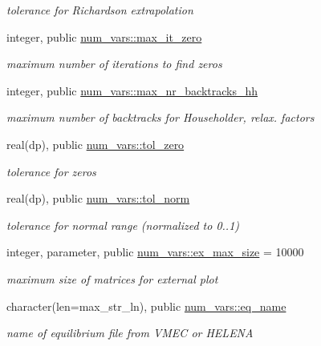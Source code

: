 \begin{DoxyCompactItemize}
\begin{DoxyCompactList}\small\item\em tolerance for Richardson extrapolation \end{DoxyCompactList}\item 
integer, public \hyperlink{namespacenum__vars_ad35971574ecb900c805b8d08745160e6}{num\+\_\+vars\+::max\+\_\+it\+\_\+zero}
\begin{DoxyCompactList}\small\item\em maximum number of iterations to find zeros \end{DoxyCompactList}\item 
integer, public \hyperlink{namespacenum__vars_aa77741498300b095e49a5d8344480b68}{num\+\_\+vars\+::max\+\_\+nr\+\_\+backtracks\+\_\+hh}
\begin{DoxyCompactList}\small\item\em maximum number of backtracks for Householder, relax. factors \end{DoxyCompactList}\item 
real(dp), public \hyperlink{namespacenum__vars_ae2387f8182114da91104322ca3250d9a}{num\+\_\+vars\+::tol\+\_\+zero}
\begin{DoxyCompactList}\small\item\em tolerance for zeros \end{DoxyCompactList}\item 
real(dp), public \hyperlink{namespacenum__vars_a301b25f19135f2bee8ccce99257ae86c}{num\+\_\+vars\+::tol\+\_\+norm}
\begin{DoxyCompactList}\small\item\em tolerance for normal range (normalized to 0..1) \end{DoxyCompactList}\item 
integer, parameter, public \hyperlink{namespacenum__vars_a032fd6a1d45689b56362d8aab1cdc57c}{num\+\_\+vars\+::ex\+\_\+max\+\_\+size} = 10000
\begin{DoxyCompactList}\small\item\em maximum size of matrices for external plot \end{DoxyCompactList}\item 
character(len=max\+\_\+str\+\_\+ln), public \hyperlink{namespacenum__vars_a3cc0fc4b1538f7203be1604cb4f7c9bc}{num\+\_\+vars\+::eq\+\_\+name}
\begin{DoxyCompactList}\small\item\em name of equilibrium file from V\+M\+EC or H\+E\+L\+E\+NA \end{DoxyCompactList}\item 

\end{DoxyCompactItemize}
